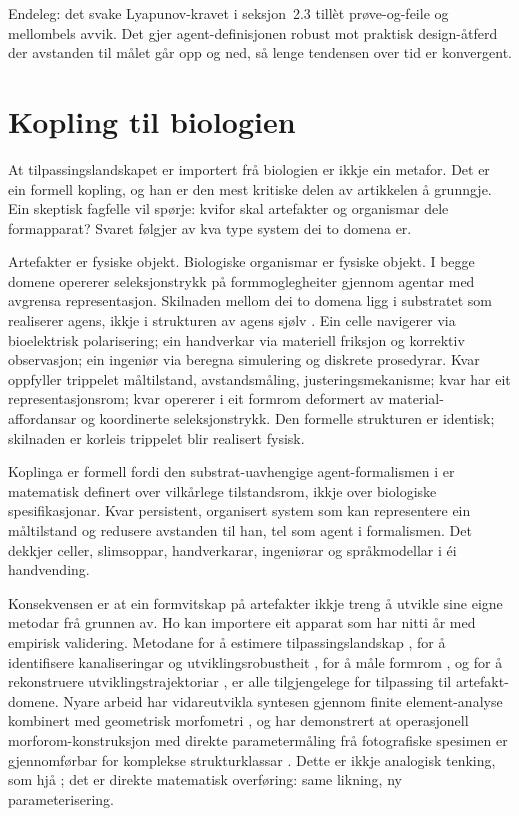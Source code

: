 \documentclass[10pt,a4paper,twocolumn]{article}
\begin{document}
Endeleg: det svake Lyapunov-kravet i seksjon~2.3 tillèt prøve-og-feile og mellombels avvik. Det gjer agent-definisjonen robust mot praktisk design-åtferd der avstanden til målet går opp og ned, så lenge tendensen over tid er konvergent.

\section{Kopling til biologien}

At tilpassingslandskapet er importert frå biologien er ikkje ein metafor. Det er ein formell kopling, og han er den mest kritiske delen av artikkelen å grunngje. Ein skeptisk fagfelle vil spørje: kvifor skal artefakter og organismar dele formapparat? Svaret følgjer av kva type system dei to domena er.

Artefakter er fysiske objekt. Biologiske organismar er fysiske objekt. I begge domene opererer seleksjonstrykk på formmoglegheiter gjennom agentar med avgrensa representasjon. Skilnaden mellom dei to domena ligg i substratet som realiserer agens, ikkje i strukturen av agens sjølv \citep{levin2022, fieldslevin2022}. Ein celle navigerer via bioelektrisk polarisering; ein handverkar via materiell friksjon og korrektiv observasjon; ein ingeniør via beregna simulering og diskrete prosedyrar. Kvar oppfyller trippelet måltilstand, avstandsmåling, justeringsmekanisme; kvar har eit representasjonsrom; kvar opererer i eit formrom deformert av material-affordansar og koordinerte seleksjonstrykk. Den formelle strukturen er identisk; skilnaden er korleis trippelet blir realisert fysisk.

Koplinga er formell fordi den substrat-uavhengige agent-formalismen i \citet{fieldslevin2022} er matematisk definert over vilkårlege tilstandsrom, ikkje over biologiske spesifikasjonar. Kvar persistent, organisert system som kan representere ein måltilstand og redusere avstanden til han, tel som agent i formalismen. Det dekkjer celler, slimsoppar, handverkarar, ingeniørar og språkmodellar i éi handvending.

Konsekvensen er at ein formvitskap på artefakter ikkje treng å utvikle sine eigne metodar frå grunnen av. Ho kan importere eit apparat som har nitti år med empirisk validering. Metodane for å estimere tilpassingslandskap \citep{wright1932, lande1979, arnold2001}, for å identifisere kanaliseringar og utviklingsrobustheit \citep{waddington1957, wagner2005}, for å måle formrom \citep{raup1966, mitteroecker2009, mcghee2007}, og for å rekonstruere utviklingstrajektoriar \citep{gould1977, arthur2004}, er alle tilgjengelege for tilpassing til artefakt-domene. Nyare arbeid har vidareutvikla syntesen gjennom finite element-analyse kombinert med geometrisk morfometri \citep{polly2016}, og har demonstrert at operasjonell morforom-konstruksjon med direkte parametermåling frå fotografiske spesimen er gjennomførbar for komplekse strukturklassar \citep{contrerasfigueroa2023}. Dette er ikkje analogisk tenking, som hjå \citet{steadman1979}; det er direkte matematisk overføring: same likning, ny parameterisering.
\end{document}
